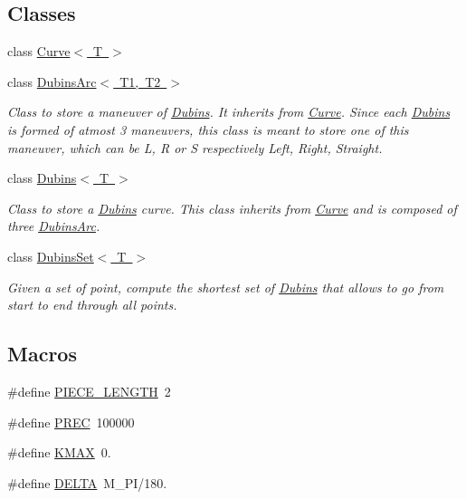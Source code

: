 \subsection*{Classes}
\begin{DoxyCompactItemize}
\item 
class \mbox{\hyperlink{class_curve}{Curve$<$ T $>$}}
\item 
class \mbox{\hyperlink{class_dubins_arc}{Dubins\+Arc$<$ T1, T2 $>$}}
\begin{DoxyCompactList}\small\item\em Class to store a maneuver of \mbox{\hyperlink{class_dubins}{Dubins}}. It inherits from {\ttfamily \mbox{\hyperlink{class_curve}{Curve}}}. Since each \mbox{\hyperlink{class_dubins}{Dubins}} is formed of atmost 3 maneuvers, this class is meant to store one of this maneuver, which can be L, R or S respectively Left, Right, Straight. \end{DoxyCompactList}\item 
class \mbox{\hyperlink{class_dubins}{Dubins$<$ T $>$}}
\begin{DoxyCompactList}\small\item\em Class to store a \mbox{\hyperlink{class_dubins}{Dubins}} curve. This class inherits from {\ttfamily \mbox{\hyperlink{class_curve}{Curve}}} and is composed of three {\ttfamily \mbox{\hyperlink{class_dubins_arc}{Dubins\+Arc}}}. \end{DoxyCompactList}\item 
class \mbox{\hyperlink{class_dubins_set}{Dubins\+Set$<$ T $>$}}
\begin{DoxyCompactList}\small\item\em Given a set of point, compute the shortest set of \mbox{\hyperlink{class_dubins}{Dubins}} that allows to go from start to end through all points. \end{DoxyCompactList}\end{DoxyCompactItemize}
\subsection*{Macros}
\begin{DoxyCompactItemize}
\item 
\#define \mbox{\hyperlink{dubins_8hh_a5b2500ca93a5100f73dc442d3cfea7d4}{P\+I\+E\+C\+E\+\_\+\+L\+E\+N\+G\+TH}}~2
\item 
\#define \mbox{\hyperlink{dubins_8hh_a2bda1a81ce3474772a8a1f165e54516e}{P\+R\+EC}}~100000
\item 
\#define \mbox{\hyperlink{dubins_8hh_a940b85a83458e94519f2685b33ddd276}{K\+M\+AX}}~0.
\item 
\#define \mbox{\hyperlink{dubins_8hh_a3fd2b1bcd7ddcf506237987ad780f495}{D\+E\+L\+TA}}~M\+\_\+\+PI/180.
\end{DoxyCompactItemize}
